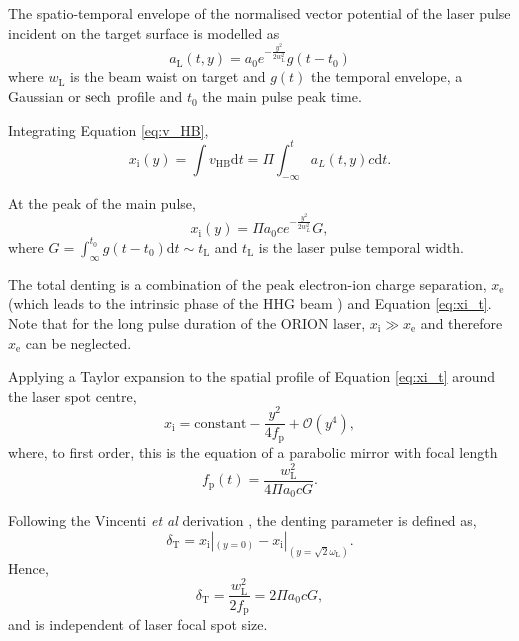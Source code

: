 The spatio-temporal envelope of the normalised vector potential of the laser pulse incident on the target surface is modelled as
\begin{equation}
	a_\mathrm{L}(t,y) = a_0e^{-\frac{y^2}{2w_\mathrm{L}^2}}g(t-t_0)
\end{equation}
where $w_\mathrm{L}$ is the beam waist on target and $g(t)$ the temporal envelope, a Gaussian or $\operatorname{sech}$ profile and $t_0$ the main pulse peak time.

Integrating Equation \ref{eq:v_HB},
\begin{equation}\label{eq:xi_t}
	x_\mathrm{i}(y) = \int v_\mathrm{HB}\mathrm{d}t = \Pi \int^t_{-\infty} a_L(t,y)c\mathrm{d}t.
\end{equation}

At the peak of the main pulse,
\begin{equation}
	x_\mathrm{i}(y) = \Pi a_0ce^{-\frac{y^2}{2w_L^2}} G,
\end{equation}
where $G = \int_\infty^{t_0} g(t-t_0) \mathrm{d} t \sim t_\mathrm{L}$ and $t_\mathrm{L}$ is the laser pulse temporal width.

The total denting is a combination of the peak electron-ion charge separation, $x_\mathrm{e}$ (which leads to the intrinsic phase of the HHG beam \cite{anderbruggePropagationRelativisticSurface2007}) and Equation \ref{eq:xi_t}. Note that for the long pulse duration of the ORION laser, $x_\mathrm{i} \gg x_\mathrm{e}$ and therefore $x_\mathrm{e}$ can be neglected.

Applying a Taylor expansion to the spatial profile of Equation \ref{eq:xi_t} around the laser spot centre,
\begin{equation}
	x_\mathrm{i} = \mathrm{constant} - \frac{y^2}{4f_\mathrm{p}} + \mathcal{O}(y^4),
\end{equation}
where, to first order, this is the equation of a parabolic mirror with focal length
\begin{equation}
	f_\mathrm{p}(t) = \frac{w_\mathrm{L}^2}{4\Pi a_0cG}.
\end{equation}

Following the Vincenti \textit{et al} derivation \cite{vincentiOpticalPropertiesRelativistic2014}, the denting parameter is defined as,
\begin{equation}
	\delta_\mathrm{T} =  x_\mathrm{i}|_{(y=0)} - x_\mathrm{i}|_{(y=\sqrt{2}\omega_\mathrm{L})}.
\end{equation}
Hence,
\begin{equation}
	\delta_\mathrm{T} = \frac{w_\mathrm{L}^2}{2f_\mathrm{p}} = 2\Pi a_0 c G,
\end{equation}
and is independent of laser focal spot size. 

